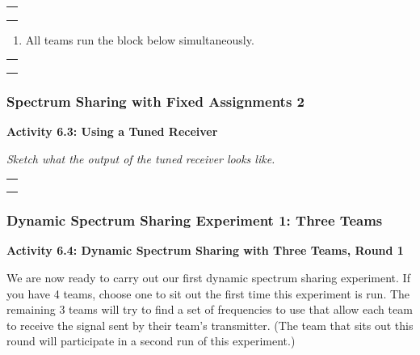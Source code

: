 \documentclass[11pt]{article}
\providecommand{\tightlist}{%
      \setlength{\itemsep}{0pt}\setlength{\parskip}{0pt}}
\begin{document}
\begin{longtable}[]{@{}l@{}}
\toprule
 \\
\midrule
\endhead
 \\
 \\
 \\
\bottomrule
\end{longtable}

\begin{enumerate}
\def\labelenumi{\arabic{enumi}.}
\setcounter{enumi}{4}
\tightlist
\item
  All teams run the block below simultaneously.
\end{enumerate}

\begin{longtable}[]{@{}l@{}}
\toprule
 \\
\midrule
\endhead
 \\
 \\
 \\
\bottomrule
\end{longtable}

    \hypertarget{spectrum-sharing-with-fixed-assignments-2}{%
\subsubsection*{Spectrum Sharing with Fixed Assignments
2}\label{spectrum-sharing-with-fixed-assignments-2}}

\textbf{Activity 6.3: Using a Tuned Receiver}

\emph{Sketch what the output of the tuned receiver looks like.}

\begin{longtable}[]{@{}l@{}}
\toprule
 \\
\midrule
\endhead
 \\
 \\
 \\
\bottomrule
\end{longtable}

\newpage
    \hypertarget{dynamic-spectrum-sharing-experiment-1-three-teams}{%
\subsubsection*{Dynamic Spectrum Sharing Experiment 1: Three
Teams}\label{dynamic-spectrum-sharing-experiment-1-three-teams}}

\textbf{Activity 6.4: Dynamic Spectrum Sharing with Three Teams, Round
1}

We are now ready to carry out our first dynamic spectrum sharing
experiment. If you have 4 teams, choose one to sit out the first time
this experiment is run. The remaining 3 teams will try to find a set of
frequencies to use that allow each team to receive the signal sent by
their team's transmitter. (The team that sits out this round will
participate in a second run of this experiment.)
\end{document}
